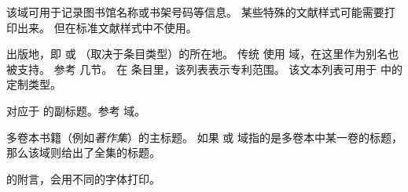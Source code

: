 \begin{fieldlist}

该域可用于记录图书馆名称或书架号码等信息。
某些特殊的文献样式可能需要打印出来。
但在标准文献样式中不使用。




出版地，即  或  （取决于条目类型）的所在地。
传统 \BibTeX 使用  域，在这里作为别名也被支持。
参考  几节。
在  条目里，该列表表示专利范围。
该文本列表可用于  中的定制类型。




对应于  的副标题。参考  域。




多卷本书籍（例如\emph{著作集}）的主标题。
如果  或  域指的是多卷本中某一卷的标题，
那么该域则给出了全集的标题。




 的附言，会用不同的字体打印。




\end{fieldlist}
